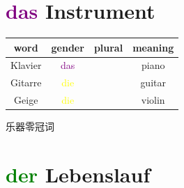 \section{\textcolor{purple}{das} Instrument}
\begin{center}
    \begin{tabular}{|c|c|c|c|}
        \hline
        \rowcolor{gray}
        word    & gender                  & plural & meaning \\
        \hline
        Klavier & \textcolor{purple}{das} &        & piano   \\
        Gitarre & \textcolor{yellow}{die} &        & guitar  \\
        Geige   & \textcolor{yellow}{die} &        & violin  \\
        \hline
    \end{tabular}
\end{center}

乐器零冠词

\section{\textcolor{green}{der} Lebenslauf}

